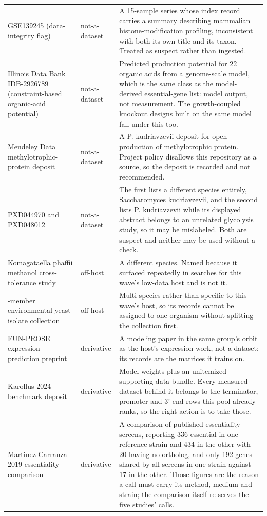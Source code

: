 \begin{longtable}{@{}L{58mm} L{26mm} L{88mm}@{}}
\addlinespace[5pt]
GSE139245 (data-integrity flag) & not-a-dataset & A 15-sample series whose index record carries a summary describing mammalian histone-modification profiling, inconsistent with both its own title and its taxon. Treated as suspect rather than ingested. \\
\addlinespace[5pt]
Illinois Data Bank IDB-2926789 (constraint-based organic-acid potential) & not-a-dataset & Predicted production potential for 22 organic acids from a genome-scale model, which is the same class as the model-derived essential-gene list: model output, not measurement. The growth-coupled knockout designs built on the same model fall under this too. \\
\addlinespace[5pt]
Mendeley Data methylotrophic-protein deposit & not-a-dataset & A P. kudriavzevii deposit for open production of methylotrophic protein. Project policy disallows this repository as a source, so the deposit is recorded and not recommended. \\
\addlinespace[5pt]
PXD044970 and PXD048012 & not-a-dataset & The first lists a different species entirely, Saccharomyces kudriavzevii, and the second lists P. kudriavzevii while its displayed abstract belongs to an unrelated glycolysis study, so it may be mislabeled. Both are suspect and neither may be used without a check. \\
\addlinespace[5pt]
Komagataella phaffii methanol cross-tolerance study & off-host & A different species. Named because it surfaced repeatedly in searches for this wave's low-data host and is not it. \\
-member environmental yeast isolate collection & off-host & Multi-species rather than specific to this wave's host, so its records cannot be assigned to one organism without splitting the collection first. \\
\addlinespace[5pt]
FUN-PROSE expression-prediction preprint & derivative & A modeling paper in the same group's orbit as the host's expression work, not a dataset: its records are the matrices it trains on. \\
\addlinespace[5pt]
Karollus 2024 benchmark deposit & derivative & Model weights plus an unitemized supporting-data bundle. Every measured dataset behind it belongs to the terminator, promoter and 3' end rows this pool already ranks, so the right action is to take those. \\
\addlinespace[5pt]
Martinez-Carranza 2019 essentiality comparison & derivative & A comparison of published essentiality screens, reporting 336 essential in one reference strain and 434 in the other with 20 having no ortholog, and only 192 genes shared by all screens in one strain against 17 in the other. Those figures are the reason a call must carry its method, medium and strain; the comparison itself re-serves the five studies' calls. \\

\end{longtable}
